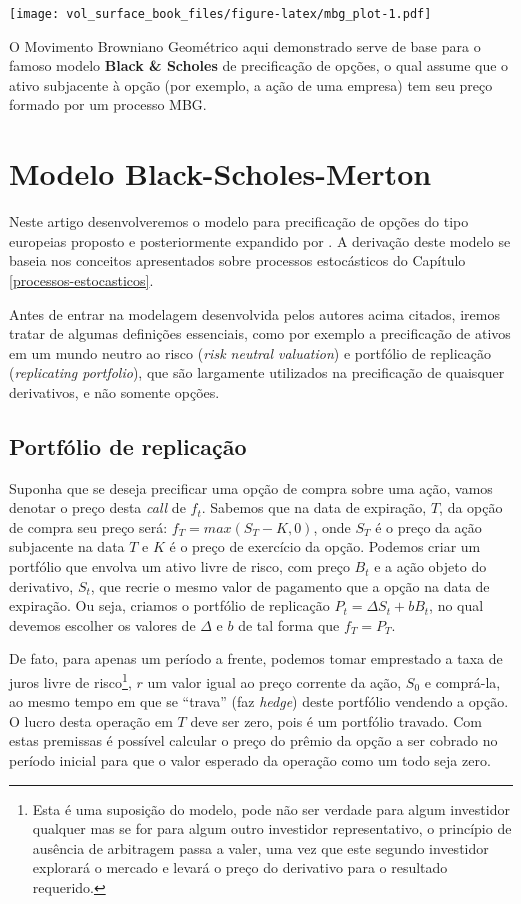\documentclass[]{book}
\let\rmarkdownfootnote\footnote%
\def\footnote{\protect\rmarkdownfootnote}
\begin{document}
\texttt{[image: vol\_surface\_book\_files/figure-latex/mbg\_plot-1.pdf]}

O Movimento Browniano Geométrico aqui demonstrado serve de base para o
famoso modelo \textbf{Black \& Scholes} de precificação de opções, o
qual assume que o ativo subjacente à opção (por exemplo, a ação de uma
empresa) tem seu preço formado por um processo MBG.

\hypertarget{bsm}{\chapter{Modelo Black-Scholes-Merton}\label{bsm}}

Neste artigo desenvolveremos o modelo para precificação de opções do
tipo europeias proposto \citet{Black1973} e posteriormente expandido por
\citet{Merton1976}. A derivação deste modelo se baseia nos conceitos
apresentados sobre processos estocásticos do Capítulo
\ref{processos-estocasticos}.

Antes de entrar na modelagem desenvolvida pelos autores acima citados,
iremos tratar de algumas definições essenciais, como por exemplo a
precificação de ativos em um mundo neutro ao risco (\emph{risk neutral
valuation}) e portfólio de replicação (\emph{replicating portfolio}),
que são largamente utilizados na precificação de quaisquer derivativos,
e não somente opções.

\section{Portfólio de replicação}\label{portfolio-de-replicacao}

Suponha que se deseja precificar uma opção de compra sobre uma ação,
vamos denotar o preço desta \emph{call} de \(f_t\). Sabemos que na data
de expiração, \(T\), da opção de compra seu preço será:
\(f_T=max(S_T - K, 0)\), onde \(S_T\) é o preço da ação subjacente na
data \(T\) e \(K\) é o preço de exercício da opção. Podemos criar um
portfólio que envolva um ativo livre de risco, com preço \(B_t\) e a
ação objeto do derivativo, \(S_t\), que recrie o mesmo valor de
pagamento que a opção na data de expiração. Ou seja, criamos o portfólio
de replicação \(P_t=\Delta S_t + b B_t\), no qual devemos escolher os
valores de \(\Delta\) e \(b\) de tal forma que \(f_T = P_T\).

De fato, para apenas um período a frente, podemos tomar emprestado a
taxa de juros livre de risco\footnote{Esta é uma suposição do modelo,
  pode não ser verdade para algum investidor qualquer mas se for para
  algum outro investidor representativo, o princípio de ausência de
  arbitragem passa a valer, uma vez que este segundo investidor
  explorará o mercado e levará o preço do derivativo para o resultado
  requerido.}, \(r\) um valor igual ao preço corrente da ação, \(S_0\) e
comprá-la, ao mesmo tempo em que se ``trava'' (faz \emph{hedge}) deste
portfólio vendendo a opção. O lucro desta operação em \(T\) deve ser
zero, pois é um portfólio travado. Com estas premissas é possível
calcular o preço do prêmio da opção a ser cobrado no período inicial
para que o valor esperado da operação como um todo seja zero.
\end{document}
